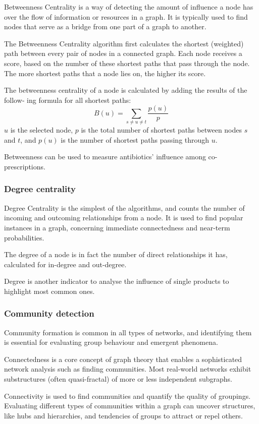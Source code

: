 Betweenness Centrality is a way of detecting the amount of influence a node has over the flow of information or resources in a graph. It is typically used to find nodes that serve as a bridge from one part of a graph to another.

The Betweenness Centrality algorithm first calculates the shortest (weighted) path between every pair of nodes in a connected graph. Each node receives a score, based on the number of these shortest paths that pass through the node. The more shortest paths that a node lies on, the higher its score.

The betweenness centrality of a node is calculated by adding the results of the follow‐ ing formula for all shortest paths:
$$B(u) = \sum_{s \neq u \neq t} \frac{p(u)}{p}$$
$u$ is the selected node, $p$ is the total number of shortest paths between nodes $s$ and $t$, and $p(u)$ is the number of shortest paths passing through $u$.

Betweenness can be used to measure antibiotics' influence among co-prescriptions.

\subsubsection{Degree centrality}
Degree Centrality is the simplest of the algorithms, and counts the number of incoming and outcoming relationships from a node. It is used to find popular instances in a graph, concerning immediate connectedness and near-term probabilities. 

The degree of a node is in fact the number of direct relationships it has, calculated for in-degree and out-degree.

Degree is another indicator to analyse the influence of single products to highlight most common ones.

\subsubsection{Community detection}
Community formation is common in all types of networks, and identifying them is essential for evaluating group behaviour and emergent phenomena. 

Connectedness is a core concept of graph theory that enables a sophisticated network analysis such as finding communities. Most real-world networks exhibit substructures (often quasi-fractal) of more or less independent subgraphs.

Connectivity is used to find communities and quantify the quality of groupings. Evaluating different types of communities within a graph can uncover structures, like hubs and hierarchies, and tendencies of groups to attract or repel others.

